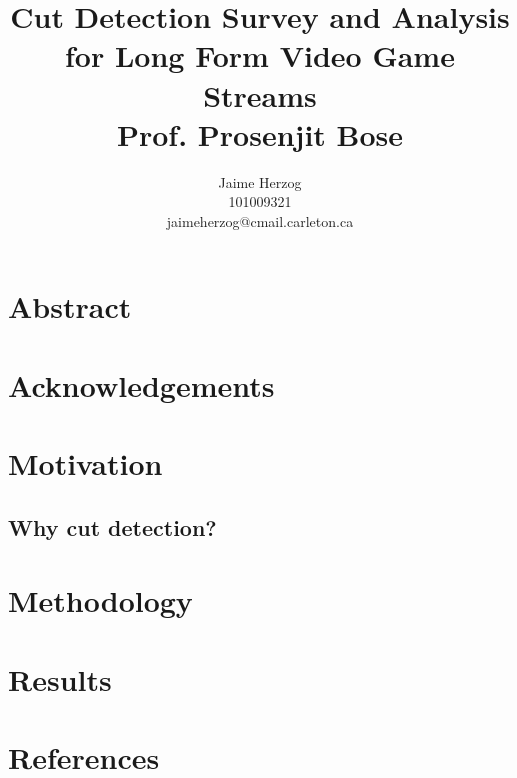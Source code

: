 \documentclass[12pt]{article}
\title{Cut Detection Survey and Analysis for Long Form Video Game Streams \\ Prof. Prosenjit Bose}
\author{Jaime Herzog\\ 101009321 \\ jaimeherzog@cmail.carleton.ca}
\begin{document}
\maketitle
\clearpage

\section{Abstract}
\blindtext
\section{Acknowledgements}
\blindtext
\clearpage

\tableofcontents
\clearpage

\section{Motivation}
\subsection{Why cut detection?}
\Blindtext
\clearpage

\section{Methodology}
\blindtext
\clearpage

\section{Results}
\blindtext
\clearpage

\section{References}
\blindtext
\clearpage
\end{document}
